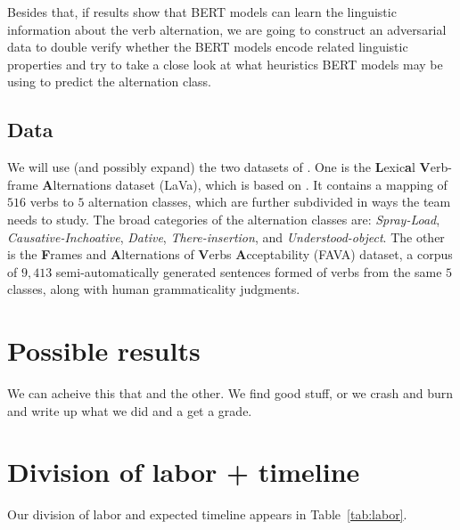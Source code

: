 \documentclass[11pt]{article}
\begin{document}
Besides that, if results show that BERT models can learn the linguistic information about the verb alternation, we are going to construct an adversarial data to double verify whether the BERT models encode related linguistic properties and try to take a close look at what heuristics BERT models may be using to predict the alternation class.
\subsection{Data}
We will use (and possibly expand) the two datasets of \citet{kann2018verb}.  One is the \textbf{L}exic\textbf{a}l \textbf{V}erb-frame \textbf{A}lternations dataset (LaVa), which is based on \citet{levin1993}.  It contains a mapping of $516$ verbs to $5$ alternation classes, which are further subdivided in ways the team needs to study.  The broad categories of the alternation classes are: \emph{Spray-Load}, \emph{Causative-Inchoative}, \emph{Dative}, \emph{There-insertion}, and \emph{Understood-object}.  The other is the \textbf{F}rames and \textbf{A}lternations of \textbf{V}erbs \textbf{A}cceptability (FAVA) dataset, a corpus of $9,413$ semi-automatically generated sentences formed of verbs from the same $5$ classes, along with human grammaticality judgments.



\section{Possible results}
We can acheive this that and the other.  We find good stuff, or we crash and burn and write up what we did and a get a grade.



\section{Division of labor + timeline}
Our division of labor and expected timeline appears in Table~\ref{tab:labor}.



\end{document}
